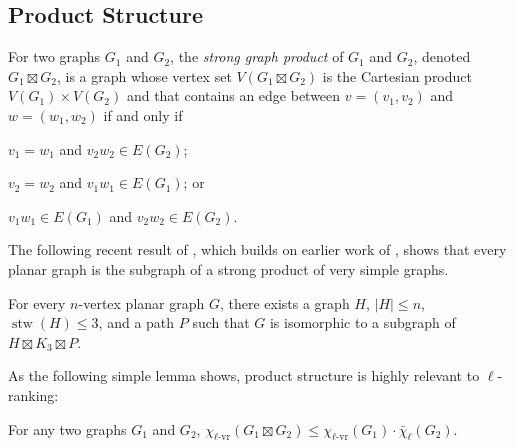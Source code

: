 \documentclass[kpfonts]{patmorin}
\DeclareMathOperator{\stw}{stw}
\newcommand{\rn}[1]{\chi_{\operatorname{#1-vr}}}
\newcommand{\lrn}{\rn{\ell}}
\newcommand{\dlcn}{\bar{\chi}_\ell}
\theoremstyle{named}
\begin{document}
\subsection{Product Structure}

For two graphs $G_1$ and $G_2$, the \emph{strong graph product} of $G_1$ and $G_2$, denoted $G_1\boxtimes G_2$, is a graph whose vertex set $V(G_1\boxtimes G_2)$ is the Cartesian product $V(G_1)\times V(G_2)$ and that contains an edge between $v=(v_1,v_2)$ and $w=(w_1,w_2)$ if and only if
\begin{inparaenum}[(i)]
    \item $v_1=w_1$ and $v_2w_2\in E(G_2)$;
    \item $v_2=w_2$ and $v_1w_1\in E(G_1)$; or
    \item $v_1w_1\in E(G_1)$ and $v_2w_2\in E(G_2)$.
\end{inparaenum}

The following recent result of \citet{dujmovic.joret.ea:planar}, which builds on earlier work of \citet{pilipczuk.siebertz:polynomial}, shows that every planar graph is the subgraph of a strong product of very simple graphs.

\begin{thm}\label{product-structure}
    For every $n$-vertex planar graph $G$, there exists a graph $H$, $|H|\le n$, $\stw(H)\le 3$, and a path $P$ such that $G$ is isomorphic to a subgraph of $H\boxtimes K_3\boxtimes P$.
\end{thm}

As the following simple lemma shows, product structure is highly relevant to $\ell$-ranking:

\begin{lem}\label{product-lemma}
    For any two graphs $G_1$ and $G_2$, $\lrn(G_1\boxtimes G_2)\le \lrn(G_1)\cdot\dlcn(G_2)$.
\end{lem}
\end{document}

